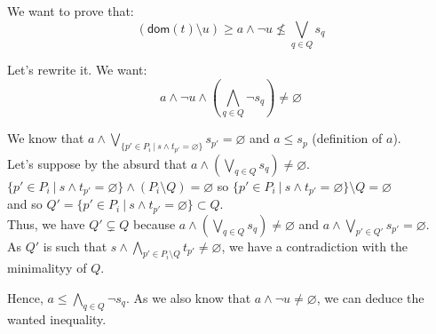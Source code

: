 \documentclass[a4paper]{article}%
\newcommand{\dom}[1]{\textsf{dom}(#1)}
\newcommand{\alt}{~|~}
\begin{document}
    We want to prove that:
    \[
        (\dom t \setminus u) \geq a \land \neg u \not\leq \bigvee_{q\in Q}s_q
    \]

    Let's rewrite it. We want:
    \[ a \land \neg u \land (\bigwedge_{q\in Q} \neg s_q) \neq \varnothing \]

    We know that $a \land \bigvee_{\{p'\in P_i\alt s\wedge t_{p'}=\varnothing\}} s_{p'} = \varnothing$ and $a \leq s_p$ (definition of $a$).\\
    Let's suppose by the absurd that $a \land (\bigvee_{q\in Q} s_q) \neq \varnothing$.\\
    $\{p'\in P_i\alt s\wedge t_{p'}=\varnothing\} \land (P_i \setminus Q) = \varnothing$ so $\{p'\in P_i\alt s\wedge t_{p'}=\varnothing\} \setminus Q = \varnothing$\\
    and so $Q'=\{p'\in P_i\alt s\wedge t_{p'}=\varnothing\} \subset Q$.\\
    Thus, we have $Q' \subsetneq Q$ because $a \land (\bigvee_{q\in Q} s_q) \neq \varnothing$ and $a \land \bigvee_{p'\in Q'} s_{p'} = \varnothing$.\\
    As $Q'$ is such that $s \land \bigwedge_{p' \in P_i\setminus Q} t_{p'} \neq \varnothing$, we have a contradiction with the minimalityy of $Q$.

    Hence, $a \leq \bigwedge_{q\in Q} \neg s_q$. As we also know that $a \land \neg u \neq \varnothing$, we can deduce the wanted inequality.
\end{document}
